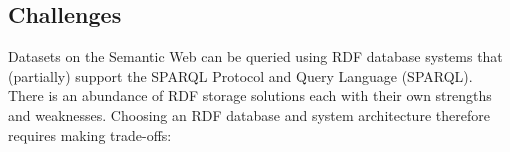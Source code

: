 \subsection{Challenges}

Datasets on the Semantic Web can be queried using RDF database systems that (partially) support the SPARQL Protocol and Query Language (SPARQL). There is an abundance of RDF storage solutions each with their own strengths and weaknesses.
Choosing an RDF database and system architecture therefore requires making trade-offs: 

